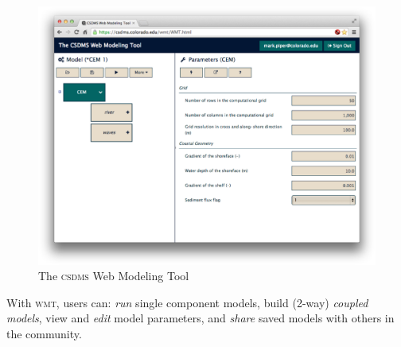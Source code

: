 \documentclass[11pt, oneside]{amsart}
\DeclareRobustCommand{\csdms}{\textsc{csdms}}
\DeclareRobustCommand{\wmt}{\textsc{wmt}}
\begin{document}
\begin{figure}
  \caption{The \csdms{} Web Modeling Tool}
  \begin{center}
    \includegraphics[scale=.25]{wmt.eps}
  \end{center}
  \label{fig:wmt_screenshot}
\end{figure}


With \wmt{}, users can: \emph{run} single component models, build (2-way)
\emph{coupled models}, view and \emph{edit} model parameters, and \emph{share}
saved models with others in the community.

\end{document}

